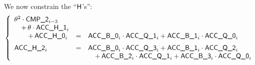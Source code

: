 We now constrain the ``$\textsf{H}$'s'':
\[
\left\{
\begin{array}{lcl}
	\theta^2	\cdot \cmp{2}_{i-3} \\
	\quad + \, \theta 	\cdot \acc{H\_1}_{i} \\
	\quad \quad + \, \acc{H\_0}_{i}
	& = &
	\acc{B\_0}_{i} \cdot \acc{Q\_1}_{i} + \acc{B\_1}_{i} \cdot \acc{Q\_0}_{i} \vspace{2mm} \\
	\acc{H\_2}_{i}
	& = &
	  \acc{B\_0}_{i} \cdot \acc{Q\_3}_{i}
	+ \acc{B\_1}_{i} \cdot \acc{Q\_2}_{i} \\
	& & \quad 
	+ \, \acc{B\_2}_{i} \cdot \acc{Q\_1}_{i}
	+ \acc{B\_3}_{i} \cdot \acc{Q\_0}_{i} \\
\end{array}
\right.
\]